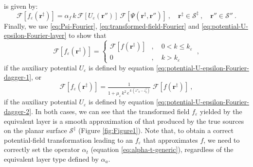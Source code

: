 \documentclass[manuscript,noblind]{geophysics}
\begin{document}
	is given by:
	\begin{equation}
		\mathcal{F} [ f_{\varepsilon}(\mathbf{r}^{\ddagger}) ] =
		\alpha_{f} \, k \, \mathcal{F} [ U_{\varepsilon}(\mathbf{r}'') ] \: 
		\mathcal{F} [ \Psi(\mathbf{r}^{\ddagger}, \mathbf{r}'') ] \: , 
		\quad \mathbf{r}^{\ddagger} \in \mathcal{S}^{\ddagger} \: ,
		\quad \mathbf{r}'' \in \mathcal{S}'' \: .
		\label{eq:transformed-field-continuous-layer-Fourier2}
	\end{equation}
	Finally, we use \ref{eq:Psi-Fourier}, \ref{eq:transformed-field-Fourier} and \ref{eq:potential-U-epsilon-Fourier-layer} to show that
	\begin{equation}
		\mathcal{F} [ f_{\varepsilon}(\mathbf{r}^{\ddagger}) ] = 
		\begin{cases}
			\mathcal{F} [ f(\mathbf{r}^{\ddagger}) ] &
			, \quad 0 < k \le k_{\varepsilon} \\
			0 & , \quad k > k_{\varepsilon} 
		\end{cases} \: ,
		\label{eq:transformed-field-continuous-layer-1-Fourier}
	\end{equation}
	if the auxiliary potential $U_{\varepsilon}$ is defined by equation \ref{eq:potential-U-epsilon-Fourier-dagger-1},
	or
	\begin{equation}
		\mathcal{F} [ f_{\varepsilon}(\mathbf{r}^{\ddagger}) ] = 
		\tfrac{1}{1 + \mu_{\varepsilon} \, k^{2} \, e^{\, k \, (z''_{0} - z^{\dagger}_{0})}} \; 
		\mathcal{F} [ f(\mathbf{r}^{\ddagger}) ] \: ,
		\label{eq:transformed-field-continuous-layer-2-Fourier}
	\end{equation}
	if the auxiliary potential $U_{\varepsilon}$ is defined by equation \ref{eq:potential-U-epsilon-Fourier-dagger-2}.
	In both cases, we can see that the transformed field $f_{\varepsilon}$ yielded by the equivalent layer 
	is a smooth approximation of that produced by the true sources on the planar surface $\mathcal{S}^{\ddagger}$
	(Figure \ref{fig:Figure1}). Note that, to obtain a correct potential-field transformation leading to an $f_{\varepsilon}$ 
	that approximates $f$, we need to correctly set the operator $\alpha_{t}$ (equation \ref{eq:alpha-t-generic}), 
	regardless of the equivalent layer type defined by $\alpha_{a}$.
	
\end{document}
